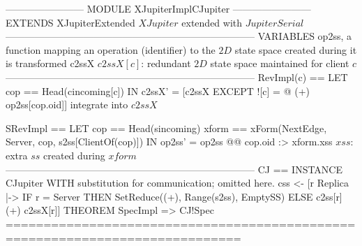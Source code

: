 \documentclass{article}
\begin{document}
\begin{tla}
------------------------ MODULE XJupiterImplCJupiter ------------------------
EXTENDS XJupiterExtended \* $XJupiter$ extended with $JupiterSerial$
-----------------------------------------------------------------------------
VARIABLES op2ss,  \* a function mapping an operation (identifier)
                  \* to the $2D$ state space created during it is transformed
          c2ssX   \* $c2ssX[c]$: redundant $2D$ state space maintained for client $c$
-----------------------------------------------------------------------------
RevImpl(c) ==
    LET cop == Head(cincoming[c])
    IN  c2ssX' = [c2ssX EXCEPT ![c] = @ (+) op2ss[cop.oid]] \* integrate into $c2ssX$

SRevImpl == 
    LET cop == Head(sincoming)
      xform == xForm(NextEdge, Server, cop, s2ss[ClientOf(cop)])
    IN op2ss' = op2ss @@ cop.oid :> xform.xss \* $xss:$ extra $ss$ created during $xform$
-----------------------------------------------------------------------------
CJ == INSTANCE CJupiter WITH \* substitution for communication; omitted here.
         css <- [r \in Replica |-> IF r = Server 
                                   THEN SetReduce((+), Range(s2ss), EmptySS)
                                   ELSE c2ss[r] (+) c2ssX[r]]
THEOREM SpecImpl => CJ!Spec
=============================================================================
\end{tla}
\end{document}
